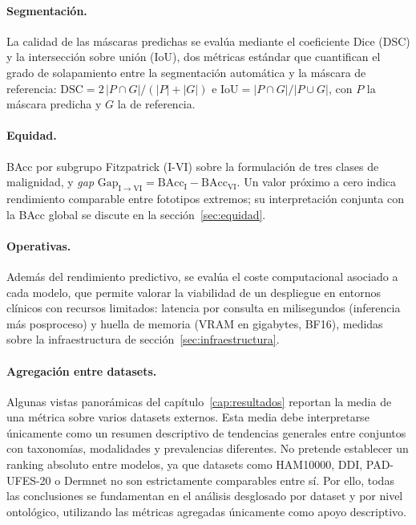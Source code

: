 \paragraph{Segmentación.}
La calidad de las máscaras predichas se evalúa mediante el
coeficiente Dice (DSC) y la intersección sobre unión (IoU), dos
métricas estándar que cuantifican el grado de solapamiento entre la
segmentación automática y la máscara de referencia:
$\mathrm{DSC} = 2\,|P\cap G|/(|P|+|G|)$ e
$\mathrm{IoU} = |P\cap G|/|P\cup G|$, con $P$ la máscara predicha y
$G$ la de referencia.

\paragraph{Equidad.}
BAcc por subgrupo Fitzpatrick (I-VI) sobre la formulación de tres
clases de malignidad, y \emph{gap}
$\mathrm{Gap}_{\mathrm{I}\to\mathrm{VI}}
= \mathrm{BAcc}_{\mathrm{I}} - \mathrm{BAcc}_{\mathrm{VI}}$. Un
valor próximo a cero indica rendimiento comparable entre fototipos
extremos; su interpretación conjunta con la BAcc global se discute en
la sección~\ref{sec:equidad}.

\paragraph{Operativas.}
Además del rendimiento predictivo, se evalúa el coste computacional
asociado a cada modelo, que permite valorar la viabilidad de un
despliegue en entornos clínicos con recursos limitados: latencia por
consulta en milisegundos (inferencia más posproceso) y huella de
memoria (VRAM en gigabytes, BF16), medidas sobre la infraestructura
de sección~\ref{sec:infraestructura}.

\paragraph{Agregación entre datasets.}
\label{sec:agregacion-datasets}
Algunas vistas panorámicas del capítulo~\ref{cap:resultados} reportan
la media de una métrica sobre varios datasets externos. Esta media
debe interpretarse únicamente como un resumen descriptivo de
tendencias generales entre conjuntos con taxonomías, modalidades y
prevalencias diferentes. No pretende establecer un ranking absoluto
entre modelos, ya que datasets como HAM10000, DDI, PAD-UFES-20 o
Dermnet no son estrictamente comparables entre sí. Por ello, todas las
conclusiones se fundamentan en el análisis desglosado por dataset y
por nivel ontológico, utilizando las métricas agregadas únicamente
como apoyo descriptivo.

